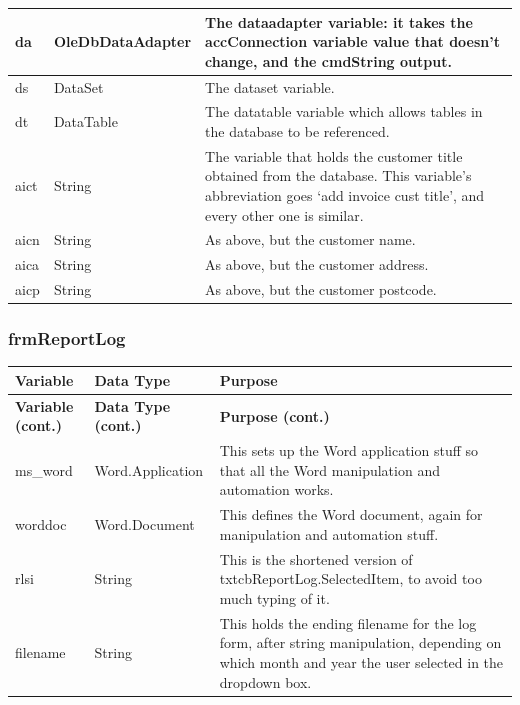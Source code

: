 \begin{longtable}{ | p{4cm} | p{3cm} | p{10cm} |}
		\hline
		da & OleDbDataAdapter & The dataadapter variable: it takes the accConnection variable value that doesn't change, and the cmdString output.\\
		\hline
		ds & DataSet & The dataset variable.\\
		\hline
		dt & DataTable & The datatable variable which allows tables in the database to be referenced.\\
		\hline
		aict & String & The variable that holds the customer title obtained from the database.  This variable's abbreviation goes `add invoice cust title', and every other one is similar.\\
		\hline
		aicn & String & As above, but the customer name.\\
		\hline
		aica & String & As above, but the customer address.\\
		\hline
		aicp & String & As above, but the customer postcode.\\
		\hline
	\end{longtable}
	
	\subsubsection{frmReportLog}
	\begin{longtable}{ | p{4cm} | p{3cm} | p{10cm} |}
		\hline
		\textbf{Variable} & \textbf{Data Type} & \textbf{Purpose}\\
		\endfirsthead
		\hline
		\textbf{Variable (cont.)} & \textbf{Data Type (cont.)} & \textbf{Purpose (cont.)}\\
		\endhead
		\hline
		ms\_word & Word.Application & This sets up the Word application stuff so that all the Word manipulation and automation works.\\
		\hline
		worddoc & Word.Document & This defines the Word document, again for manipulation and automation stuff.\\
		\hline
		rlsi & String & This is the shortened version of txtcbReportLog.SelectedItem, to avoid too much typing of it.\\
		\hline
		filename & String & This holds the ending filename for the log form, after string manipulation, depending on which month and year the user selected in the dropdown box.\\
		\hline
	\end{longtable}
	
